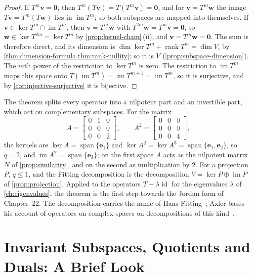 \begin{proof}
If $T^m\mathbf v=\mathbf 0$, then $T^m(T\mathbf v)=T(T^m\mathbf v)=\mathbf 0$, and for $\mathbf v=T^m\mathbf w$ the image $T\mathbf v=T^m(T\mathbf w)$ lies in $\operatorname{im}T^m$; so both subspaces are mapped into themselves. If $\mathbf v\in\ker T^m\cap\operatorname{im}T^m$, then $\mathbf v=T^m\mathbf w$ with $T^{2m}\mathbf w=T^m\mathbf v=\mathbf 0$, so $\mathbf w\in\ker T^{2m}=\ker T^m$ by \cref{prop:kernel-chain}\,(ii), and $\mathbf v=T^m\mathbf w=\mathbf 0$. The sum is therefore direct, and its dimension is $\dim\ker T^m+\operatorname{rank}T^m=\dim V$, by \cref{thm:dimension-formula,thm:rank-nullity}; so it is $V$ (\cref{prop:subspace-dimension}). The $m$th power of the restriction to $\ker T^m$ is zero. The restriction to $\operatorname{im}T^m$ maps this space onto $T(\operatorname{im}T^m)=\operatorname{im}T^{m+1}=\operatorname{im}T^m$, so it is surjective, and by \cref{cor:injective-surjective} it is bijective.
\end{proof}

The theorem splits every operator into a nilpotent part and an invertible part, which act on complementary subspaces. For the matrix
\[
A=\begin{bmatrix}0&1&0\\0&0&0\\0&0&2\end{bmatrix},\qquad A^2=\begin{bmatrix}0&0&0\\0&0&0\\0&0&4\end{bmatrix},
\]
the kernels are $\ker A=\operatorname{span}\{\mathbf e_1\}$ and $\ker A^2=\ker A^3=\operatorname{span}\{\mathbf e_1,\mathbf e_2\}$, so $q=2$, and $\operatorname{im}A^2=\operatorname{span}\{\mathbf e_3\}$; on the first space $A$ acts as the nilpotent matrix $N$ of \cref{prop:similarity}, and on the second as multiplication by $2$. For a projection $P$, $q\le1$, and the Fitting decomposition is the decomposition $V=\ker P\oplus\operatorname{im}P$ of \cref{prop:projection}. Applied to the operators $T-\lambda\operatorname{id}$ for the eigenvalues $\lambda$ of \cref{ch:eigenvalues}, the theorem is the first step towards the Jordan form of Chapter~22. The decomposition carries the name of Hans Fitting~\cite{fitting1933}; Axler bases his account of operators on complex spaces on decompositions of this kind~\cite[Chap.~8]{axler2024}.

\section{Invariant Subspaces, Quotients and Duals: A Brief Look}
\label{sec:invariant-quotient-dual}

